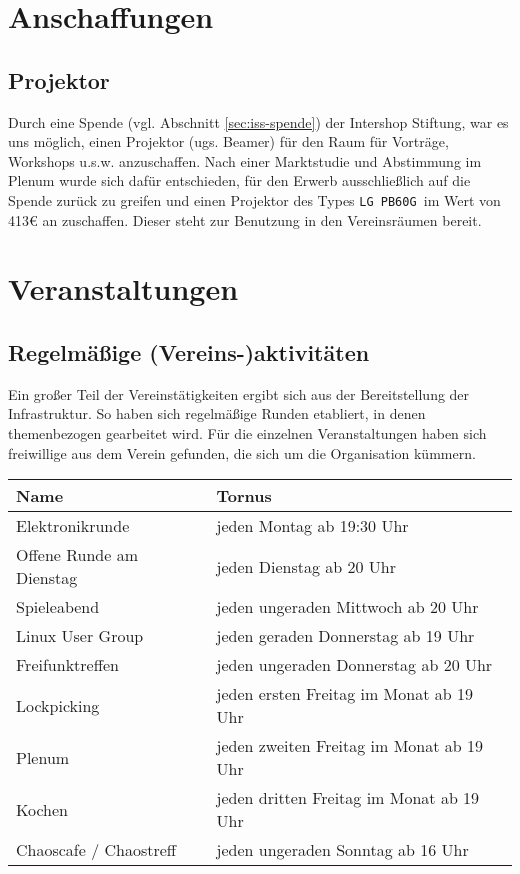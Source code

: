 \documentclass[10pt,DIV16]{scrartcl}
\begin{document}
\section{Anschaffungen}


\subsection{Projektor}
\label{sec:beamerkauf}

Durch eine Spende (vgl. Abschnitt \ref{sec:iss-spende}) der
Intershop Stiftung, war es uns möglich, einen Projektor (ugs. Beamer) für den Raum
für Vorträge, Workshops u.s.w. anzuschaffen. Nach einer Marktstudie
und Abstimmung im Plenum wurde sich dafür entschieden, für den
Erwerb ausschließlich auf die Spende zurück zu greifen und einen
Projektor des Types \texttt{LG PB60G }im Wert von 413\euro{} an
zuschaffen. Dieser steht zur Benutzung in den Vereinsräumen bereit.

\section{Veranstaltungen}

\subsection{Regelmäßige (Vereins-)aktivitäten}

Ein großer Teil der Vereinstätigkeiten ergibt sich aus der 
Bereitstellung der Infrastruktur. So haben sich regelmäßige Runden 
etabliert, in denen themenbezogen gearbeitet wird. Für die 
einzelnen Veranstaltungen haben sich freiwillige aus dem Verein 
gefunden, die sich um die Organisation kümmern.

\begin{table}[h]
	\begin{tabular}{l|l}
		Name   &  Tornus \\ \hline
		Elektronikrunde   &  jeden Montag ab 19:30 Uhr\\
		Offene Runde am Dienstag   &  jeden Dienstag ab 20 Uhr\\
		Spieleabend   &  jeden ungeraden Mittwoch ab 20 Uhr\\
		Linux User Group   &  jeden geraden Donnerstag ab 19 Uhr\\
		Freifunktreffen   &  jeden ungeraden Donnerstag ab 20 Uhr\\
		Lockpicking   &  jeden ersten Freitag im Monat ab 19 Uhr\\
		Plenum   &  jeden zweiten Freitag im Monat ab 19 Uhr\\
		Kochen   &  jeden dritten Freitag im Monat ab 19 Uhr\\
		Chaoscafe / Chaostreff   &  jeden ungeraden Sonntag ab 16 Uhr\\
\end{tabular}
\end{table}
\end{document}
